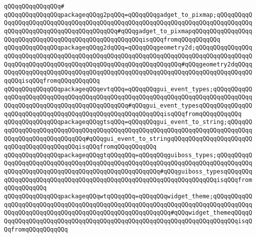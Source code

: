 \verb|qQQqqQQqqQQqqQQq#|\newline
\verb|qQQqqQQqqQQqqQQqpackageqQQqg2pqQQq=qQQqqQQqgadget_to_pixmap;qQQqqQQqqQQqqQQqqQQqqQQqqQQqqQQqqQQqqQQqqQQqqQQqqQQqqQQqqQQqqQQqqQQqqQQqqQQqqQQqqQQqqQQqqQQqqQQqqQQqqQQqqQQqqQQq#qQQqgadget_to_pixmapqQQqqQQqqQQqqQQqqQQqqQQqqQQqqQQqqQQqqQQqqQQqqQQqqQQqqQQqisqQQqfromqQQqqQQqqQQq|\newline
\verb|qQQqqQQqqQQqqQQqpackageqQQqg2dqQQq=qQQqqQQqgeometry2d;qQQqqQQqqQQqqQQqqQQqqQQqqQQqqQQqqQQqqQQqqQQqqQQqqQQqqQQqqQQqqQQqqQQqqQQqqQQqqQQqqQQqqQQqqQQqqQQqqQQqqQQqqQQqqQQqqQQqqQQqqQQqqQQqqQQqqQQq#qQQqgeometry2dqQQqqQQqqQQqqQQqqQQqqQQqqQQqqQQqqQQqqQQqqQQqqQQqqQQqqQQqqQQqqQQqqQQqqQQqqQQqqQQqisqQQqfromqQQqqQQqqQQq|\newline
\verb|qQQqqQQqqQQqqQQqpackageqQQqevtqQQq=qQQqqQQqgui_event_types;qQQqqQQqqQQqqQQqqQQqqQQqqQQqqQQqqQQqqQQqqQQqqQQqqQQqqQQqqQQqqQQqqQQqqQQqqQQqqQQqqQQqqQQqqQQqqQQqqQQqqQQqqQQqqQQqqQQq#qQQqgui_event_typesqQQqqQQqqQQqqQQqqQQqqQQqqQQqqQQqqQQqqQQqqQQqqQQqqQQqqQQqqQQqisqQQqfromqQQqqQQqqQQq|\newline
\verb|qQQqqQQqqQQqqQQqpackageqQQqgtsqQQq=qQQqqQQqgui_event_to_string;qQQqqQQqqQQqqQQqqQQqqQQqqQQqqQQqqQQqqQQqqQQqqQQqqQQqqQQqqQQqqQQqqQQqqQQqqQQqqQQqqQQqqQQqqQQqqQQqqQQq#qQQqgui_event_to_stringqQQqqQQqqQQqqQQqqQQqqQQqqQQqqQQqqQQqqQQqqQQqisqQQqfromqQQqqQQqqQQq|\newline
\newline
\verb|qQQqqQQqqQQqqQQqpackageqQQqgtqQQqqQQq=qQQqqQQqguiboss_types;qQQqqQQqqQQqqQQqqQQqqQQqqQQqqQQqqQQqqQQqqQQqqQQqqQQqqQQqqQQqqQQqqQQqqQQqqQQqqQQqqQQqqQQqqQQqqQQqqQQqqQQqqQQqqQQqqQQqqQQqqQQq#qQQqguiboss_typesqQQqqQQqqQQqqQQqqQQqqQQqqQQqqQQqqQQqqQQqqQQqqQQqqQQqqQQqqQQqqQQqqQQqisqQQqfromqQQqqQQqqQQq|\newline
\verb|qQQqqQQqqQQqqQQqpackageqQQqwtqQQqqQQq=qQQqqQQqwidget_theme;qQQqqQQqqQQqqQQqqQQqqQQqqQQqqQQqqQQqqQQqqQQqqQQqqQQqqQQqqQQqqQQqqQQqqQQqqQQqqQQqqQQqqQQqqQQqqQQqqQQqqQQqqQQqqQQqqQQqqQQqqQQqqQQq#qQQqwidget_themeqQQqqQQqqQQqqQQqqQQqqQQqqQQqqQQqqQQqqQQqqQQqqQQqqQQqqQQqqQQqqQQqqQQqqQQqisqQQqfromqQQqqQQqqQQq|\newline
